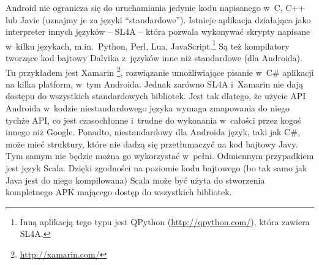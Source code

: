 Android nie ogranicza się do uruchamiania jedynie kodu napisanego w~C, C++ lub Javie (uznajmy je za języki ``standardowe''). Istnieje aplikacja działająca jako interpreter innych języków -- SL4A\cite{androidsl4a} -- która pozwala wykonywać skrypty napisane w~kilku językach, m.in.\ Python, Perl, Lua, JavaScript.\footnote{Inną aplikacją tego typu jest QPython (\url{http://qpython.com/}), która zawiera SL4A.}
Są też kompilatory tworzące kod bajtowy Dalvika z~języków inne niż standardowe (dla Androida). Tu przykładem jest Xamarin \footnote{\url{http://xamarin.com/}}, rozwiązanie umożliwiające pisanie w~C\# aplikacji na kilka platform, w~tym Androida.
Jednak zarówno SL4A i~Xamarin nie dają dostępu do wszystkich standardowych bibliotek. Jest tak dlatego, że użycie API Androida w~kodzie niestandardowego języka wymaga zmapowania do niego tychże API, co jest czasochłonne i~trudne do wykonania w~całości przez kogoś innego niż Google. Ponadto, niestandardowy dla Androida język, taki jak C\#, może mieć struktury, które nie dadzą się przetłumaczyć na kod bajtowy Javy. Tym samym nie będzie można go wykorzystać w~pełni. Odmiennym przypadkiem jest język Scala. Dzięki zgodności na poziomie kodu bajtowego (bo tak samo jak Java jest do niego kompilowana) Scala może być użyta do stworzenia kompletnego APK mającego dostęp do wszystkich bibliotek.


